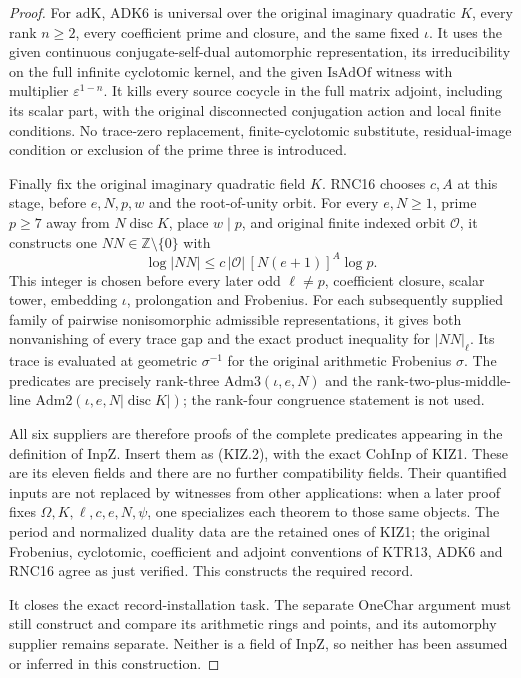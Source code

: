 \begin{proof}
For \(\mathrm{adK}\), ADK6 is universal over the original
imaginary quadratic \(K\), every rank \(n\ge2\), every
coefficient prime and closure, and the same fixed \(\iota\).
It uses the given continuous conjugate-self-dual automorphic
representation, its irreducibility on the full infinite cyclotomic
kernel, and the given \(\mathrm{IsAdOf}\) witness with multiplier
\(\varepsilon^{1-n}\).  It kills every source cocycle in the
full matrix adjoint, including its scalar part, with the original
disconnected conjugation action and local finite conditions.  No
trace-zero replacement, finite-cyclotomic substitute, residual-image
condition or exclusion of the prime three is introduced.

Finally fix the original imaginary quadratic field \(K\).
RNC16 chooses \(c,A\) at this stage, before \(e,N,p,w\)
and the root-of-unity orbit.  For every \(e,N\ge1\), prime
\(p\ge7\) away from \(N\operatorname{disc}K\), place
\(w\mid p\), and original finite indexed orbit \(\mathcal O\),
it constructs one \(NN\in\mathbb Z\setminus\{0\}\) with
\[
 \log|NN|\le c\,|\mathcal O|\,[N(e+1)]^A\log p.
 \tag{KIZ.6}
\]
This integer is chosen before every later odd \(\ell\ne p\),
coefficient closure, scalar tower, embedding \(\iota\),
prolongation and Frobenius.  For each subsequently supplied family
of pairwise nonisomorphic admissible representations, it gives both
nonvanishing of every trace gap and the exact product inequality
for \(|NN|_\ell\).  Its trace is evaluated at geometric
\(\sigma^{-1}\) for the original arithmetic Frobenius \(\sigma\).
The predicates are precisely rank-three \(\mathrm{Adm3}(\iota,e,N)\)
and the rank-two-plus-middle-line
\(\mathrm{Adm2}(\iota,e,N|\operatorname{disc}K|)\); the
rank-four congruence statement is not used.

All six suppliers are therefore proofs of the complete predicates
appearing in the definition of \(\mathrm{InpZ}\).  Insert them
as (KIZ.2), with the exact \(\mathrm{CohInp}\) of KIZ1.
These are its eleven fields and there are no further compatibility
fields.  Their quantified inputs are not replaced by witnesses from
other applications: when a later proof fixes \(\Omega,K,\ell,c,
e,N,\psi\), one specializes each theorem to those same objects.
The period and normalized duality data are the retained ones of
KIZ1; the original Frobenius, cyclotomic, coefficient and adjoint
conventions of KTR13, ADK6 and RNC16 agree as just verified.
This constructs the required record.

It closes the exact record-installation task.  The separate
\(\mathrm{OneChar}\) argument must still construct and compare
its arithmetic rings and points, and its automorphy supplier remains
separate.  Neither is a field of \(\mathrm{InpZ}\), so neither
has been assumed or inferred in this construction.
\end{proof}

